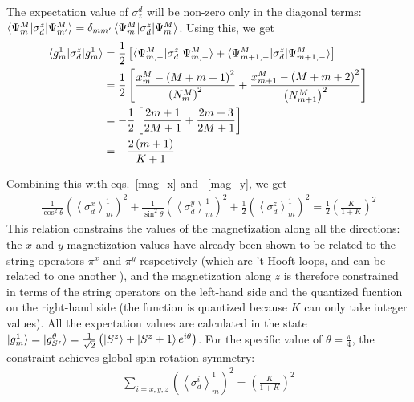 \documentclass[12pt]{revtex4-2}
\begin{document}
The expectation value of \(\sigma^d_z\) will be non-zero only in the diagonal terms: \(\braket{\Psi^M_m | \sigma^z_d | \Psi^M_{m^\prime}} = \delta_{mm^\prime}\braket{\Psi^M_m | \sigma^z_d | \Psi^M_{m}}\). Using this, we get
\begin{equation}\begin{aligned}
	\braket{g_m^1|\sigma^z_d|g_m^1} &= \frac{1}{2}\left[\braket{\Psi^M_{m,-}|\sigma_d^z | \Psi^M_{m,-}} + \braket{\Psi^M_{m+1,-}|\sigma_d^z | \Psi^M_{m+1,-}}\right]\\
					&= \frac{1}{2}\left[\frac{x^M_m - \left( M+m+1 \right) ^2}{\left( N^M_m \right) ^2} + \frac{x^M_{m+1} - \left( M+m+2 \right) ^2}{\left( N^M_{m+1} \right) ^2}\right]\\
					&= -\frac{1}{2}\left[\frac{2m+1}{2M+1} + \frac{2m+3}{2M+1}\right]\\
					&= - \frac{2\left( m+1 \right) }{K+1}
\end{aligned}\end{equation}

Combining this with eqs.~\ref{mag_x} and ~\ref{mag_y}, we get
\begin{equation}\begin{aligned}
	\frac{1}{\cos^2\theta}\left(\left<\sigma^x_d\right>_m^1\right)^2 + \frac{1}{\sin^2\theta}\left(\left<\sigma^y_d\right>_m^1\right)^2 + \frac{1}{2}\left(\left<\sigma^z_d\right>_m^1\right)^2 = \frac{1}{2}\left(\frac{K}{1+K}\right)^2
\end{aligned}\end{equation}
This relation constrains the values of the magnetization along all the directions: the \(x\) and \(y\) magnetization values have already been shown to be related to the string operators \(\pi^x\) and \(\pi^y\) respectively (which are 't Hooft loops, and can be related to one another ), and the magnetization along \(z\) is therefore constrained in terms of the string operators on the left-hand side and the quantized fucntion on the right-hand side (the function is quantized because \(K\) can only take integer values). All the expectation values are calculated in the state \(\ket{g^1_m} = \ket{g^\theta_{S^z}} = \frac{1}{\sqrt 2}\left(\ket{S^z} + \ket{S^z+1}e^{i\theta}\right) \). For the specific value of \(\theta = \frac{\pi}{4}\), the constraint achieves global spin-rotation symmetry:
\begin{equation}\begin{aligned}
	\sum_{i=x,y,z}\left(\left<\sigma^i_d\right>_m^1\right)^2 = \left(\frac{K}{1+K}\right)^2
\end{aligned}\end{equation}
\end{document}
